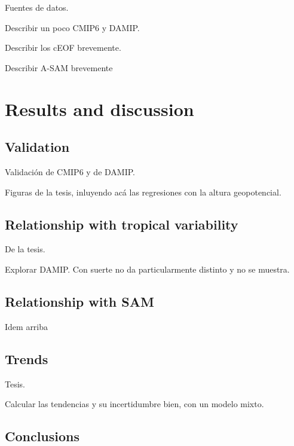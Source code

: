 \documentclass[sn-basic,pdflatex]{sn-jnl}
\theoremstyle{remark}
\theoremstyle{definition}
\begin{document}
Fuentes de datos.

Describir un poco CMIP6 y DAMIP.

Describir los cEOF brevemente.

Describir A-SAM brevemente

\hypertarget{restuls}{%
\section{Results and discussion}\label{restuls}}

\hypertarget{validation}{%
\subsection{Validation}\label{validation}}

Validación de CMIP6 y de DAMIP.

Figuras de la tesis, inluyendo acá las regresiones con la altura geopotencial.

\hypertarget{relationship-with-tropical-variability}{%
\subsection{Relationship with tropical variability}\label{relationship-with-tropical-variability}}

De la tesis.

Explorar DAMIP. Con suerte no da particularmente distinto y no se muestra.

\hypertarget{relationship-with-sam}{%
\subsection{Relationship with SAM}\label{relationship-with-sam}}

Idem arriba

\hypertarget{trends}{%
\subsection{Trends}\label{trends}}

Tesis.

Calcular las tendencias y su incertidumbre bien, con un modelo mixto.

\hypertarget{conclusions}{%
\subsection{Conclusions}\label{conclusions}}


\end{document}
